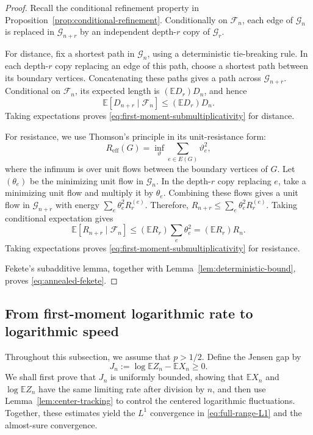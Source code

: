 \documentclass[a4paper,fleqn]{cas-sc}
\numberwithin{equation}{section}
\theoremstyle{plain}
\theoremstyle{definition}
\newcommand{\E}{\mathbb E}
\begin{document}
\begin{proof}
Recall the conditional refinement property in
Proposition~\ref{prop:conditional-refinement}.  Conditionally on
$\mathcal F_n$, each edge of $\mathcal G_n$ is replaced in
$\mathcal G_{n+r}$ by an independent depth-$r$ copy of $\mathcal G_r$.

For distance, fix a shortest path in $\mathcal G_n$, using a deterministic
tie-breaking rule.  In each depth-$r$ copy replacing an edge of this path,
choose a shortest path between its boundary vertices.  Concatenating these
paths gives a path across $\mathcal G_{n+r}$.  Conditional on $\mathcal F_n$,
its expected length is $(\E D_r)D_n$, and hence
\[
 \E[D_{n+r}\mid\mathcal F_n]\le (\E D_r)D_n.
\]
Taking expectations proves \eqref{eq:first-moment-submultiplicativity} for
distance.

For resistance, we use Thomson's principle in its unit-resistance form:
\[
 R_{\mathrm{eff}}(G)
 =\inf_{\vartheta}\sum_{e\in E(G)}\vartheta_e^2,
\]
where the infimum is over unit flows between the boundary vertices of $G$.  Let
$(\theta_e)$ be the minimizing unit flow in $\mathcal G_n$.  In the
depth-$r$ copy replacing $e$, take a minimizing unit flow
and multiply it by $\theta_e$.
Combining these flows gives a unit flow in $\mathcal G_{n+r}$ with
energy $\sum_e\theta_e^2R_r^{(e)}$.  Therefore,
$R_{n+r}\le\sum_e\theta_e^2R_r^{(e)}$.
Taking conditional expectation gives
\[
 \E[R_{n+r}\mid\mathcal F_n]
 \le (\E R_r)\sum_e\theta_e^2
 = (\E R_r)R_n.
\]
Taking expectations proves \eqref{eq:first-moment-submultiplicativity} for
resistance.

Fekete's subadditive lemma, together with Lemma~\ref{lem:deterministic-bound}, proves
\eqref{eq:annealed-fekete}.
\end{proof}

\subsection{From first-moment logarithmic rate to logarithmic speed}
\label{sec:annealed-to-typical}

Throughout this subsection, we assume that $p>1/2$.  Define the Jensen gap by
\begin{equation}
\label{eq:jensen-gap}
 J_n:=\log\E Z_n-\E X_n\ge0.
\end{equation}
We shall first prove that $J_n$ is uniformly bounded, showing that $\E X_n$
and $\log\E Z_n$ have the same limiting rate after division by $n$, and then
use Lemma~\ref{lem:center-tracking} to control the centered logarithmic
fluctuations.  Together, these estimates yield the $L^1$ convergence in
\eqref{eq:full-range-L1} and the almost-sure convergence.
\end{document}
